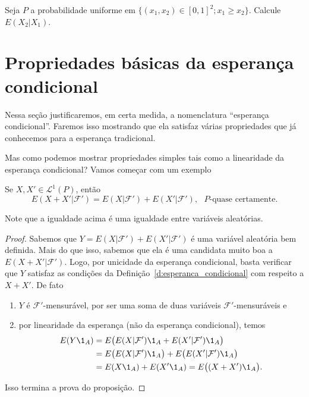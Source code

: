 \documentclass[../Notas_de_aula.tex]{subfiles}
\begin{document}
\begin{exercise}
  Seja $P$ a probabilidade uniforme em $\{(x_1, x_2) \in [0,1]^2; x_1 \geq x_2\}$.
  Calcule $E(X_2|X_1)$.
\end{exercise}

\section{Propriedades básicas da esperança condicional}

Nessa seção justificaremos, em certa medida, a nomenclatura ``esperança condicional''.
Faremos isso mostrando que ela satisfaz várias propriedades que já conhecemos para a esperança tradicional.

Mas como podemos mostrar propriedades simples tais como a linearidade da esperança condicional?
Vamos começar com um exemplo

\begin{proposition}
  Se $X, X' \in \mathcal{L}^1(P)$, então
  \begin{equation}
    E(X + X'|\mathcal{F}') = E(X|\mathcal{F}') + E(X'|\mathcal{F}'), \text{ $P$-quase certamente.}
  \end{equation}
\end{proposition}

Note que a igualdade acima é uma igualdade entre variáveis aleatórias.

\begin{proof}
  Sabemos que $Y = E(X|\mathcal{F}') + E(X'|\mathcal{F}')$ é uma variável aleatória bem definida.
  Mais do que isso, sabemos que ela é uma candidata muito boa a $E(X + X'|\mathcal{F}')$.
  Logo, por unicidade da esperança condicional, basta verificar que $Y$ satisfaz as condições da Definição~\ref{d:esperanca_condicional} com respeito a $X + X'$.
  De fato
  \begin{enumerate}[\quad a)]
  \item $Y$ é $\mathcal{F}'$-mensurável, por ser uma soma de duas variáveis $\mathcal{F}'$-mensuráveis e
  \item por linearidade da esperança (não da esperança condicional), temos
    \begin{equation}
      \begin{split}
        E(Y \1_A) & = E\big( E(X|\mathcal{F}')\1_A + E(X'|\mathcal{F}')\1_A \big)\\
        & = E\big( E(X|\mathcal{F}')\1_A\big) + E\big(E(X'|\mathcal{F}')\1_A \big)\\
        & = E(X \1_A) + E(X' \1_A) = E\big( (X + X') \1_A \big).
      \end{split}
    \end{equation}
  \end{enumerate}
  Isso termina a prova do proposição.
\end{proof}
\end{document}
